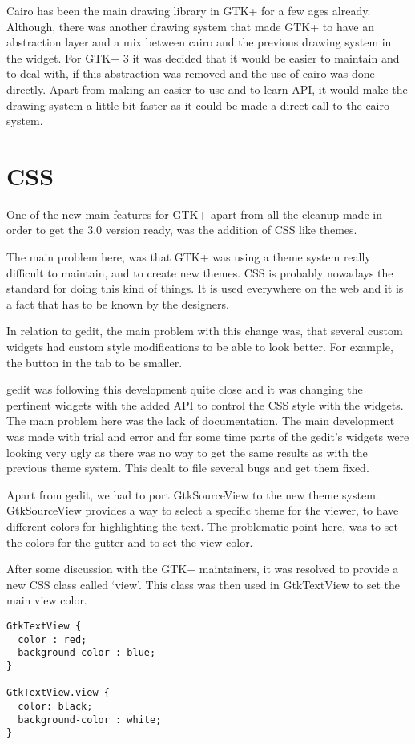 Cairo has been the main drawing library in GTK+ for a few ages already. Although, there was another drawing system that made GTK+ to have an abstraction layer and a mix between cairo and the previous drawing system in the widget. For GTK+ 3 it was decided that it would be easier to maintain and to deal with, if this abstraction was removed and the use of cairo was done directly. Apart from making an easier to use and to learn API, it would make the drawing system a little bit faster as it could be made a direct call to the cairo system.

\section{CSS}

One of the new main features for GTK+ apart from all the cleanup made in order to get the 3.0 version ready, was the addition of CSS like themes.

The main problem here, was that GTK+ was using a theme system really difficult to maintain, and to create new themes. CSS is probably nowadays the standard for doing this kind of things. It is used everywhere on the web and it is a fact that has to be known by the designers.

In relation to gedit, the main problem with this change was, that several custom widgets had custom style modifications to be able to look better. For example, the button in the tab to be smaller.

gedit was following this development quite close and it was changing the pertinent widgets with the added API to control the CSS style with the widgets. The main problem here was the lack of documentation. The main development was made with trial and error and for some time parts of the gedit's widgets were looking very ugly as there was no way to get the same results as with the previous theme system. This dealt to file several bugs and get them fixed.

Apart from gedit, we had to port GtkSourceView to the new theme system. GtkSourceView provides a way to select a specific theme for the viewer, to have different colors for highlighting the text. The problematic point here, was to set the colors for the gutter and to set the view color.

After some discussion with the GTK+ maintainers, it was resolved to provide a new CSS class called `view'. This class was then used in GtkTextView to set the main view color.

\begin{lstlisting}[style=plain]
GtkTextView {
  color : red;
  background-color : blue;
}

GtkTextView.view {
  color: black;
  background-color : white;
}
\end{lstlisting}

